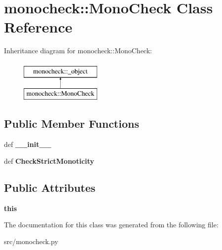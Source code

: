 \hypertarget{classmonocheck_1_1MonoCheck}{
\section{monocheck::MonoCheck Class Reference}
\label{d7/de1/classmonocheck_1_1MonoCheck}
}
Inheritance diagram for monocheck::MonoCheck:\begin{figure}[H]
\begin{center}
\leavevmode
\includegraphics[height=2cm]{d7/de1/classmonocheck_1_1MonoCheck}
\end{center}
\end{figure}
\subsection*{Public Member Functions}
\begin{DoxyCompactItemize}
\item 
\hypertarget{classmonocheck_1_1MonoCheck_a69a5e0b89b39ff0c0caac2604605dddd}{
def {\bfseries \_\-\_\-init\_\-\_\-}}
\label{d7/de1/classmonocheck_1_1MonoCheck_a69a5e0b89b39ff0c0caac2604605dddd}

\item 
\hypertarget{classmonocheck_1_1MonoCheck_a9684b1459e63268cf3a3962e79827355}{
def {\bfseries CheckStrictMonoticity}}
\label{d7/de1/classmonocheck_1_1MonoCheck_a9684b1459e63268cf3a3962e79827355}

\end{DoxyCompactItemize}
\subsection*{Public Attributes}
\begin{DoxyCompactItemize}
\item 
\hypertarget{classmonocheck_1_1MonoCheck_a4e896031c1c1933907b882f4c4807cae}{
{\bfseries this}}
\label{d7/de1/classmonocheck_1_1MonoCheck_a4e896031c1c1933907b882f4c4807cae}

\end{DoxyCompactItemize}


The documentation for this class was generated from the following file:\begin{DoxyCompactItemize}
\item 
src/monocheck.py\end{DoxyCompactItemize}
